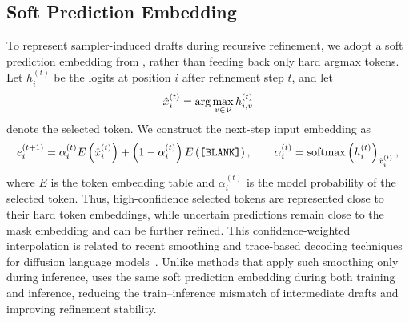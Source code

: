 \subsection{Soft Prediction Embedding}
To represent sampler-induced drafts during recursive refinement, we adopt a soft prediction embedding from \citep{dmax}, rather than feeding back only hard argmax tokens. 
Let $h_i^{(t)}$ be the logits at position $i$ after refinement step $t$, and let
\begin{equation*}
    \hat{x}_i^{(t)}
    =
    \arg\max_{v\in\mathcal{V}} h_{i,v}^{(t)}
\end{equation*}
denote the selected token. 
We construct the next-step input embedding as
\begin{equation}
    e_i^{(t+1)}
    =
    \alpha_i^{(t)}
    E\left(\hat{x}_i^{(t)}\right)
    +
    \left(1-\alpha_i^{(t)}\right)
    E\left(\texttt{[BLANK]}\right),
    \qquad
    \alpha_i^{(t)}
    =
    \mathrm{softmax}\left(h_i^{(t)}\right)_{\hat{x}_i^{(t)}},
    \label{eq:soft_prediction_embedding}
\end{equation}
where $E$ is the token embedding table and $\alpha_i^{(t)}$ is the model probability of the selected token. 
Thus, high-confidence selected tokens are represented close to their hard token embeddings, while uncertain predictions remain close to the mask embedding and can be further refined. 
This confidence-weighted interpolation is related to recent smoothing and trace-based decoding techniques for diffusion language models~\citep{smoothie,credit-decoding}. 
Unlike methods that apply such smoothing only during inference, \method uses the same soft prediction embedding during both training and inference, reducing the train--inference mismatch of intermediate drafts and improving refinement stability.

